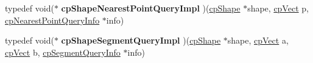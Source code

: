 \begin{DoxyCompactItemize}
\item 
\hypertarget{group__cp_shape_ga204b2f5406a370fb3fccb143d8fa5464}{typedef void($\ast$ {\bfseries cp\-Shape\-Nearest\-Point\-Query\-Impl} )(\hyperlink{structcp_shape}{cp\-Shape} $\ast$shape, \hyperlink{structcp_vect}{cp\-Vect} p, \hyperlink{structcp_nearest_point_query_info}{cp\-Nearest\-Point\-Query\-Info} $\ast$info)}\label{group__cp_shape_ga204b2f5406a370fb3fccb143d8fa5464}

\item 
\hypertarget{group__cp_shape_gabb2d4615c2ba473a3485b2a07b88895d}{typedef void($\ast$ {\bfseries cp\-Shape\-Segment\-Query\-Impl} )(\hyperlink{structcp_shape}{cp\-Shape} $\ast$shape, \hyperlink{structcp_vect}{cp\-Vect} a, \hyperlink{structcp_vect}{cp\-Vect} b, \hyperlink{structcp_segment_query_info}{cp\-Segment\-Query\-Info} $\ast$info)}\label{group__cp_shape_gabb2d4615c2ba473a3485b2a07b88895d}

\end{DoxyCompactItemize}
